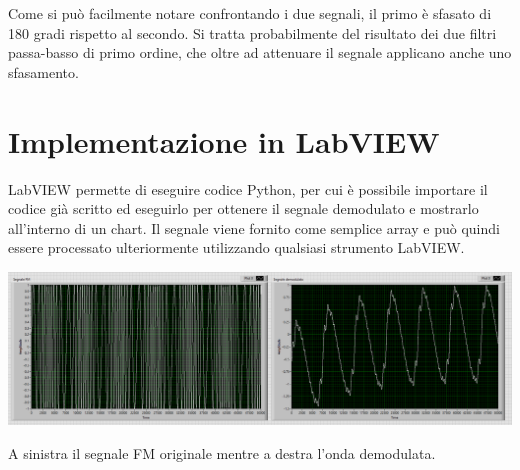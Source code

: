 \documentclass{article}
\begin{document}
\vspace{2cm}
Come si può facilmente notare confrontando i due segnali, il primo è sfasato di 180 gradi rispetto al secondo.
Si tratta probabilmente del risultato dei due filtri passa-basso di primo ordine, che oltre ad attenuare il segnale
applicano anche uno sfasamento.

\section{Implementazione in LabVIEW}
LabVIEW permette di eseguire codice Python, per cui è possibile importare il codice già scritto ed eseguirlo per ottenere
il segnale demodulato e mostrarlo all'interno di un chart. Il segnale viene fornito come semplice array e può
quindi essere processato ulteriormente utilizzando qualsiasi strumento LabVIEW.

\begin{center}
    \includegraphics[width=\textwidth]{labview.png}
\end{center}

A sinistra il segnale FM originale mentre a destra l'onda demodulata.
\end{document}
